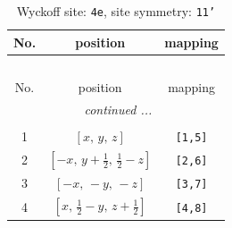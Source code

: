 \documentclass[fleqn,8pt]{jsarticle}
\begin{document}
\begin{longtable}{ccc}
\caption{Wyckoff site: {\tt 4e}, site symmetry: {\tt 11'}}
 \\
 \hline \hline
No. & position & mapping \\ \hline \endfirsthead

\multicolumn{2}{l}{\tablename\ \thetable{}} \\
 \hline \hline
No. & position & mapping \\ \hline \endhead

 \hline \hline
\multicolumn{2}{r}{\footnotesize\it continued ...} \\ \endfoot

 \hline \hline
\multicolumn{2}{r}{} \\ \endlastfoot

1 & $\left[ x,\, y,\, z \right]$ & {\tt [1,5]} \\ \hline
2 & $\left[ - x,\, y + \frac{1}{2},\, \frac{1}{2} - z \right]$ & {\tt [2,6]} \\ \hline
3 & $\left[ - x,\, - y,\, - z \right]$ & {\tt [3,7]} \\ \hline
4 & $\left[ x,\, \frac{1}{2} - y,\, z + \frac{1}{2} \right]$ & {\tt [4,8]} \\
\end{longtable}
\end{document}
